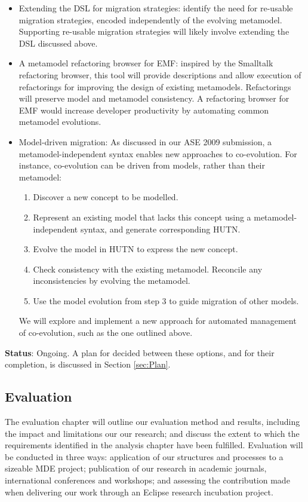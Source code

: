 \begin{itemize}
	\item Extending the DSL for migration strategies: \cite{herrmannsdoerfer08automatability} identify the need for re-usable migration strategies, encoded independently of the evolving metamodel. Supporting re-usable migration strategies will likely involve extending the DSL discussed above. 
	\item A metamodel refactoring browser for EMF: inspired by the Smalltalk refactoring browser, this tool will provide descriptions and allow execution of refactorings for improving the design of existing metamodels. Refactorings will preserve model and metamodel consistency. A refactoring browser for EMF would increase developer productivity by automating common metamodel evolutions.
	\item Model-driven migration: As discussed in our ASE 2009 submission, a metamodel-independent syntax enables new approaches to co-evolution. For instance, co-evolution can be driven from models, rather than their metamodel:
	\begin{enumerate}
		\item Discover a new concept to be modelled.
		\item Represent an existing model that lacks this concept using a metamodel-independent syntax, and generate corresponding HUTN.
		\item Evolve the model in HUTN to express the new concept.
		\item Check consistency with the existing metamodel. Reconcile any inconsistencies by evolving the metamodel.
		\item Use the model evolution from step 3 to guide migration of other models.
	\end{enumerate}
	We will explore and implement a new approach for automated management of co-evolution, such as the one outlined above.
\end{itemize}

\textbf{Status}: Ongoing. A plan for decided between these options, and for their completion, is discussed in Section \ref{sec:Plan}.


\subsection{Evaluation}
The evaluation chapter will outline our evaluation method and results, including the impact and limitations our our research; and discuss the extent to which the requirements identified in the analysis chapter have been fulfilled. Evaluation will be conducted in three ways: application of our structures and processes to a sizeable MDE project; publication of our research in academic journals, international conferences and workshops; and assessing the contribution made when delivering our work through an Eclipse research incubation project.

